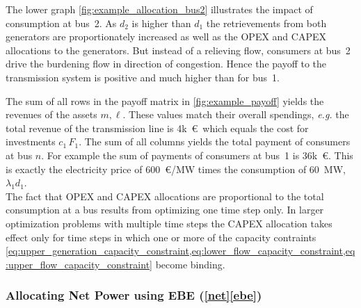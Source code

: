 \documentclass[11pt,twocolumn]{article}
\begin{document}
The lower graph \cref{fig:example_allocation_bus2} illustrates the impact of consumption at bus~2. As $d_2$ is higher than $d_1$ the retrievements from both generators are proportionately increased as well as the OPEX and CAPEX allocations to the generators. But instead of a relieving flow, consumers at bus~2 drive the burdening flow in direction of congestion. Hence the payoff to the transmission system is positive and much higher than for bus~1.

The sum of all rows in the payoff matrix in \cref{fig:example_payoff} yields the revenues of the assets $m, \ell$. These values match their overall spendings, \textit{e.g.} the total revenue of the transmission line is 4k~\euro\, which equals the cost for investments $c_{1}\,F_{1}$. The sum of all columns yields the total payment of consumers at bus $n$. For example the sum of payments of consumers at bus~1 is 36k~\euro. This is exactly the electricity price of 600~\euro/MW times the consumption of 60~MW, $\lambda_1 d_1$. \\

The fact that OPEX and CAPEX allocations are proportional to the total consumption at a bus results from optimizing one time step only. In larger optimization problems with multiple time steps the CAPEX allocation takes effect only for time steps in which one or more of the capacity contraints  \cref{eq:upper_generation_capacity_constraint,eq:lower_flow_capacity_constraint,eq:upper_flow_capacity_constraint} become binding.  


\subsubsection*{Allocating Net Power using EBE (\ref{net}\ref{ebe}) }
\end{document}
